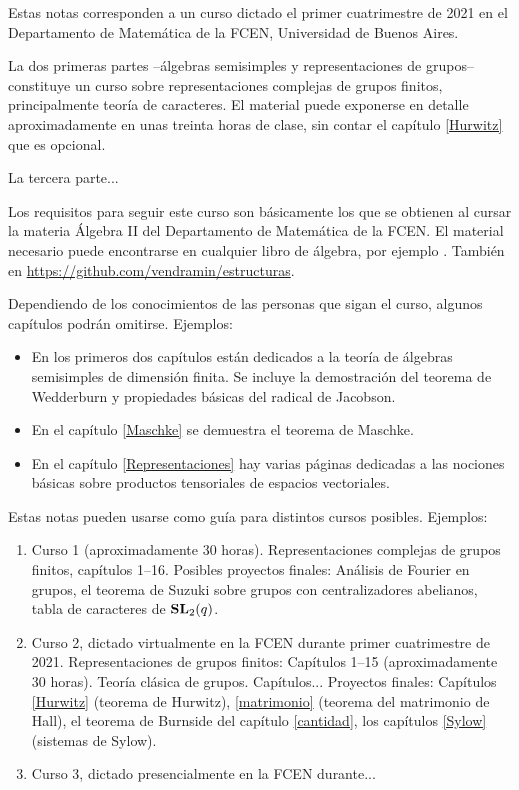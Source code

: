 \preface

Estas notas corresponden a un curso dictado el primer cuatrimestre de 2021 en 
el Departamento de Matemática de la FCEN, Universidad de Buenos Aires. 

La dos primeras partes --álgebras semisimples y representaciones de grupos-- 
constituye un curso sobre representaciones complejas 
de grupos finitos, principalmente teoría de caracteres. El material 
puede exponerse en detalle aproximadamente en unas treinta horas 
de clase, sin contar el capítulo \ref{Hurwitz}  
que es opcional. 

La tercera parte...



Los requisitos para seguir este curso son básicamente los
que se obtienen al cursar la materia Álgebra II del 
Departamento de Matemática de la FCEN. El material 
necesario puede encontrarse en cualquier libro de álgebra, por ejemplo \cite{MR600654}.
También en \url{https://github.com/vendramin/estructuras}.

Dependiendo
de los conocimientos de las personas que sigan el curso, 
algunos capítulos podrán omitirse. Ejemplos: 

\begin{itemize}
    \item En los primeros dos capítulos están dedicados a la teoría de álgebras semisimples de dimensión finita. Se incluye la demostración del teorema de Wedderburn y propiedades básicas del radical de Jacobson. 
    \item En el capítulo \ref{Maschke} se demuestra el teorema de Maschke. 
    \item En el capítulo \ref{Representaciones} hay varias páginas dedicadas a las nociones básicas sobre
    productos tensoriales de espacios vectoriales. 
\end{itemize}

Estas notas pueden usarse como guía para distintos cursos posibles. 
Ejemplos:  
\begin{enumerate}
    \item Curso 1 (aproximadamente 30 horas). 
    Representaciones complejas de grupos finitos, capítulos 1--16. 
    Posibles proyectos finales: Análisis de Fourier en grupos, 
    el teorema de Suzuki sobre grupos con centralizadores abelianos, tabla de caracteres de
    $\mathbf{SL}_2(q)$. 
    \item Curso 2, dictado virtualmente en la FCEN durante primer cuatrimestre de 2021. 
    Representaciones de grupos finitos: Capítulos 1--15 (aproximadamente 30 horas). 
    Teoría clásica de grupos. Capítulos... Proyectos finales: Capítulos \ref{Hurwitz} (teorema de Hurwitz), 
    \ref{matrimonio} (teorema del matrimonio de Hall), el teorema de Burnside del capítulo \ref{cantidad}, 
    los capítulos 
    \ref{Sylow} (sistemas de Sylow).
    \item Curso 3, dictado presencialmente en la FCEN durante... 
\end{enumerate}



